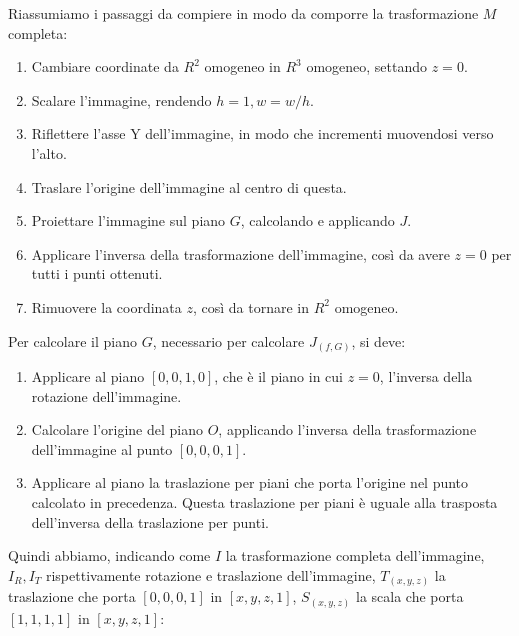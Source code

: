 Riassumiamo i passaggi da compiere in modo da comporre la trasformazione $M$ completa:
\begin{enumerate}
    \item Cambiare coordinate da $R^2$ omogeneo in $R^3$ omogeneo, settando $z=0$.
    \item Scalare l'immagine, rendendo $h = 1, w = w/h$.
    \item Riflettere l'asse Y dell'immagine, in modo che incrementi muovendosi verso l'alto.
    \item Traslare l'origine dell'immagine al centro di questa.
    \item Proiettare l'immagine sul piano $G$, calcolando e applicando $J$.
    \item Applicare l'inversa della trasformazione dell'immagine, così da avere $z=0$ per tutti i punti ottenuti.
    \item Rimuovere la coordinata $z$, così da tornare in $R^2$ omogeneo.
\end{enumerate}
Per calcolare il piano $G$, necessario per calcolare $J_{(f, G)}$, si deve:
\begin{enumerate}
    \item Applicare al piano $[0, 0, 1, 0]$, che è il piano in cui $z=0$, l'inversa della rotazione dell'immagine.
    \item Calcolare l'origine del piano $O$, applicando l'inversa della trasformazione dell'immagine al punto $[0, 0, 0, 1]$.
    \item Applicare al piano la traslazione per piani che porta l'origine nel punto calcolato in precedenza. Questa traslazione per piani è uguale alla trasposta dell'inversa della traslazione per punti.
\end{enumerate}
Quindi abbiamo, indicando come $I$ la trasformazione completa dell'immagine, $I_R, I_T$ rispettivamente rotazione e traslazione dell'immagine, $T_{(x, y, z)}$ la traslazione che porta $[0, 0, 0, 1]$ in $[x, y, z, 1]$, $S_{(x, y, z)}$ la scala che porta $[1, 1, 1, 1]$ in $[x, y, z, 1]$:
